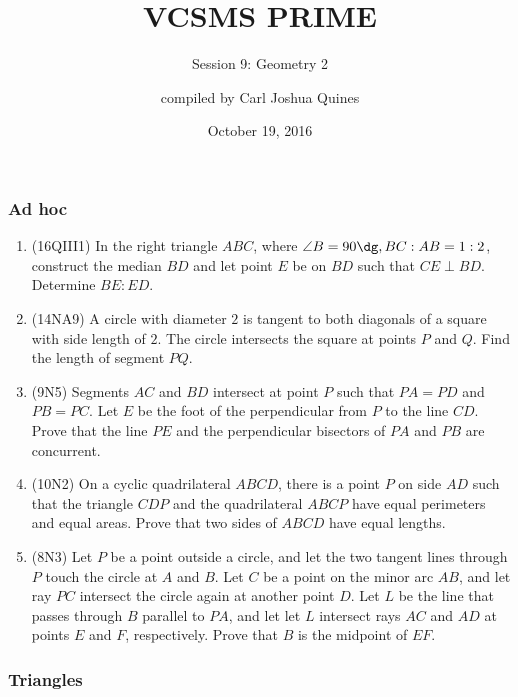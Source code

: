 \documentclass[10pt,paper=letter]{scrartcl}
\begin{document}
\title{VCSMS PRIME}
\subtitle{Session 9: Geometry 2}
\author{compiled by Carl Joshua Quines}
\date{October 19, 2016}

\maketitle

\subsubsection*{Ad hoc}

\begin{enumerate}

\item (16QIII1) In the right triangle $ABC$, where $\angle B = 90\dg, BC : AB = 1 : 2$, construct the median $BD$ and let point $E$ be on $BD$ such that $CE \perp BD$. Determine $BE : ED$.

\item (14NA9) A circle with diameter $2$ is tangent to both diagonals of a square with side length of $2$. The circle intersects the square at points $P$ and $Q$. Find the length of segment $PQ$.

\item (9N5) Segments $AC$ and $BD$ intersect at point $P$ such that $PA = PD$ and $PB = PC$. Let $E$ be the foot of the perpendicular from $P$ to the line $CD$. Prove that the line $PE$ and the perpendicular bisectors of $PA$ and $PB$ are concurrent.

\item (10N2) On a cyclic quadrilateral $ABCD$, there is a point $P$ on side $AD$ such that the triangle $CDP$ and the quadrilateral $ABCP$ have equal perimeters and equal areas. Prove that two sides of $ABCD$ have equal lengths.

\item (8N3) Let $P$ be a point outside a circle, and let the two tangent lines through $P$ touch the circle at $A$ and $B$. Let $C$ be a point on the minor arc $AB$, and let ray $PC$ intersect the circle again at another point $D$. Let $L$ be the line that passes through $B$ parallel to $PA$, and let let $L$ intersect rays $AC$ and $AD$ at points $E$ and $F$, respectively. Prove that $B$ is the midpoint of $EF$.

\end{enumerate}

\subsubsection*{Triangles}
\end{document}
